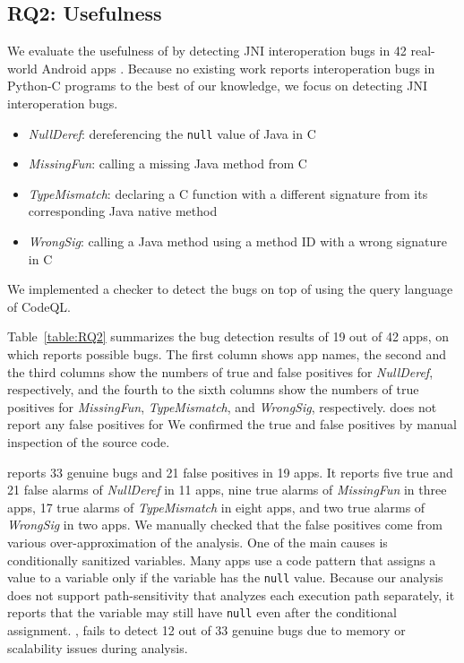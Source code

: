 \subsection{RQ2: Usefulness}
We evaluate the usefulness of \ours by detecting JNI interoperation bugs in
42 real-world Android apps .
Because no existing work reports interoperation bugs in Python-C programs
to the best of our knowledge, we focus on detecting JNI interoperation bugs.
\begin{itemize}
  \item {\it NullDeref}: dereferencing the {\tt null} value of Java in C
  \item {\it MissingFun}: calling a missing Java method from C
  \item {\it TypeMismatch}: declaring a C function with a different signature
    from its corresponding Java native method
  \item {\it WrongSig}: calling a Java method using a method ID with a
    wrong signature in C
\end{itemize}
We implemented a checker to detect the bugs on top of \ours using the
query language of CodeQL. 

Table~\ref{table:RQ2} summarizes the bug detection results of 19 out of 42
apps, on which \ours reports possible bugs.  The first
column shows app names, the second and the third columns show the
numbers of true and false positives for {\it NullDeref}, respectively, and
the fourth to the sixth columns show the numbers of true positives for {\it
MissingFun}, {\it TypeMismatch}, and {\it WrongSig}, respectively.
\ours does not report any false positives for 
We confirmed the true and false positives by manual inspection of the source code.

\ours reports 33 genuine bugs and 21 false positives in 19 apps.
It reports five true and 21 false alarms of {\it NullDeref} in 11 apps,
nine true alarms of {\it MissingFun} in three apps,
17 true alarms of {\it TypeMismatch} in eight apps, and
two true alarms of {\it WrongSig} in two apps.
We manually checked that the false positives come from various over-approximation
of the analysis. One of the main causes is conditionally sanitized variables.  Many apps
use a code pattern that assigns a value to a variable only if the variable has
the {\tt null} value. Because our analysis does not support
path-sensitivity that analyzes each execution path separately, it reports that
the variable may still have {\tt null} even after the conditional assignment.
, \lees fails to detect 12 out of 33 genuine bugs
due to memory or scalability issues during analysis.

